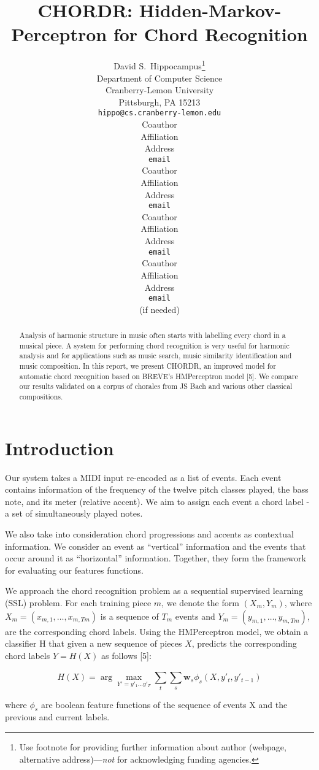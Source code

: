 \documentclass{article} %
\title{CHORDR: Hidden-Markov-Perceptron for Chord Recognition}
\author{
David S.~Hippocampus\thanks{ Use footnote for providing further information
about author (webpage, alternative address)---\emph{not} for acknowledging
funding agencies.} \\
Department of Computer Science\\
Cranberry-Lemon University\\
Pittsburgh, PA 15213 \\
\texttt{hippo@cs.cranberry-lemon.edu} \\
\And
Coauthor \\
Affiliation \\
Address \\
\texttt{email} \\
\AND
Coauthor \\
Affiliation \\
Address \\
\texttt{email} \\
\And
Coauthor \\
Affiliation \\
Address \\
\texttt{email} \\
\And
Coauthor \\
Affiliation \\
Address \\
\texttt{email} \\
(if needed)\\
}
\begin{document}
\maketitle

\begin{abstract}
Analysis of harmonic structure in music often starts with labelling every chord in a musical piece. A system for performing chord recognition is very useful for harmonic analysis and for applications such as music search, music similarity identification and music composition. In this report, we present CHORDR, an improved model for automatic chord recognition based on BREVE’s HMPerceptron model [5]. We compare our results validated on a corpus of chorales from JS Bach and various other classical compositions.
\end{abstract}

\section{Introduction}

Our system takes a MIDI input re-encoded as a list of events. Each event contains information of the frequency of the twelve pitch classes played, the bass note, and its meter (relative accent). We aim to assign each event a chord label - a set of simultaneously played notes.

We also take into consideration chord progressions and accents as contextual information. We consider an event as “vertical” information and the events that occur around it as “horizontal” information. Together, they form the framework for evaluating our features functions.

We approach the chord recognition problem as a sequential supervised learning (SSL) problem. For each training piece $m$, we denote the form $(X_m, Y_m)$, where $X_m = (x_{m,1},\ldots,x_{m,Tm})$ is a sequence of $T_m$ events and $Y_m = (y_{m,1},\ldots,y_{m,Tm})$, are the corresponding chord labels. Using the HMPerceptron model, we obtain a classifier H that given a new sequence of pieces $X$, predicts the corresponding chord labels $Y=H(X)$ as follows [5]:

\begin{equation}
  H(X) = \arg\max_{Y'={y'_1\ldots y'_T}}\sum_t^{}\sum_s^{}\mathbf{w}_s\phi_s(X,y'_t,y'_{t-1})
\end{equation}

where $\phi_s$ are boolean feature functions of the sequence of events X and the previous and current labels.
\end{document}
